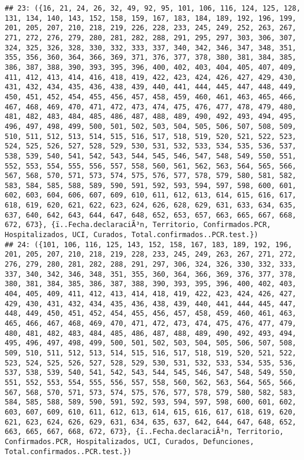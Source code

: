 \documentclass[
]{book}
\begin{document}
\begin{verbatim}
## 23: ({16, 21, 24, 26, 32, 49, 92, 95, 101, 106, 116, 124, 125, 128, 131, 134, 140, 143, 152, 158, 159, 167, 183, 184, 189, 192, 196, 199, 201, 205, 207, 210, 218, 219, 226, 228, 233, 245, 249, 252, 263, 267, 271, 272, 276, 279, 280, 281, 282, 288, 291, 295, 297, 303, 306, 307, 324, 325, 326, 328, 330, 332, 333, 337, 340, 342, 346, 347, 348, 351, 355, 356, 360, 364, 366, 369, 371, 376, 377, 378, 380, 381, 384, 385, 386, 387, 388, 390, 393, 395, 396, 400, 402, 403, 404, 405, 407, 409, 411, 412, 413, 414, 416, 418, 419, 422, 423, 424, 426, 427, 429, 430, 431, 432, 434, 435, 436, 438, 439, 440, 441, 444, 445, 447, 448, 449, 450, 451, 452, 454, 455, 456, 457, 458, 459, 460, 461, 463, 465, 466, 467, 468, 469, 470, 471, 472, 473, 474, 475, 476, 477, 478, 479, 480, 481, 482, 483, 484, 485, 486, 487, 488, 489, 490, 492, 493, 494, 495, 496, 497, 498, 499, 500, 501, 502, 503, 504, 505, 506, 507, 508, 509, 510, 511, 512, 513, 514, 515, 516, 517, 518, 519, 520, 521, 522, 523, 524, 525, 526, 527, 528, 529, 530, 531, 532, 533, 534, 535, 536, 537, 538, 539, 540, 541, 542, 543, 544, 545, 546, 547, 548, 549, 550, 551, 552, 553, 554, 555, 556, 557, 558, 560, 561, 562, 563, 564, 565, 566, 567, 568, 570, 571, 573, 574, 575, 576, 577, 578, 579, 580, 581, 582, 583, 584, 585, 588, 589, 590, 591, 592, 593, 594, 597, 598, 600, 601, 602, 603, 604, 606, 607, 609, 610, 611, 612, 613, 614, 615, 616, 617, 618, 619, 620, 621, 622, 623, 624, 626, 628, 629, 631, 633, 634, 635, 637, 640, 642, 643, 644, 647, 648, 652, 653, 657, 663, 665, 667, 668, 672, 673}, {ï..Fecha.declaraciÃ³n, Territorio, Confirmados.PCR, Hospitalizados, UCI, Curados, Total.confirmados..PCR.test.})
## 24: ({101, 106, 116, 125, 143, 152, 158, 167, 183, 189, 192, 196, 201, 205, 207, 210, 218, 219, 228, 233, 245, 249, 263, 267, 271, 272, 276, 279, 280, 281, 282, 288, 291, 297, 306, 324, 326, 330, 332, 333, 337, 340, 342, 346, 348, 351, 355, 360, 364, 366, 369, 376, 377, 378, 380, 381, 384, 385, 386, 387, 388, 390, 393, 395, 396, 400, 402, 403, 404, 405, 409, 411, 412, 413, 414, 418, 419, 422, 423, 424, 426, 427, 429, 430, 431, 432, 434, 435, 436, 438, 439, 440, 441, 444, 445, 447, 448, 449, 450, 451, 452, 454, 455, 456, 457, 458, 459, 460, 461, 463, 465, 466, 467, 468, 469, 470, 471, 472, 473, 474, 475, 476, 477, 479, 480, 481, 482, 483, 484, 485, 486, 487, 488, 489, 490, 492, 493, 494, 495, 496, 497, 498, 499, 500, 501, 502, 503, 504, 505, 506, 507, 508, 509, 510, 511, 512, 513, 514, 515, 516, 517, 518, 519, 520, 521, 522, 523, 524, 525, 526, 527, 528, 529, 530, 531, 532, 533, 534, 535, 536, 537, 538, 539, 540, 541, 542, 543, 544, 545, 546, 547, 548, 549, 550, 551, 552, 553, 554, 555, 556, 557, 558, 560, 562, 563, 564, 565, 566, 567, 568, 570, 571, 573, 574, 575, 576, 577, 578, 579, 580, 582, 583, 584, 585, 588, 589, 590, 591, 592, 593, 594, 597, 598, 600, 601, 602, 603, 607, 609, 610, 611, 612, 613, 614, 615, 616, 617, 618, 619, 620, 621, 623, 624, 626, 629, 631, 634, 635, 637, 642, 644, 647, 648, 652, 663, 665, 667, 668, 672, 673}, {ï..Fecha.declaraciÃ³n, Territorio, Confirmados.PCR, Hospitalizados, UCI, Curados, Defunciones, Total.confirmados..PCR.test.})
\end{verbatim}
\end{document}
